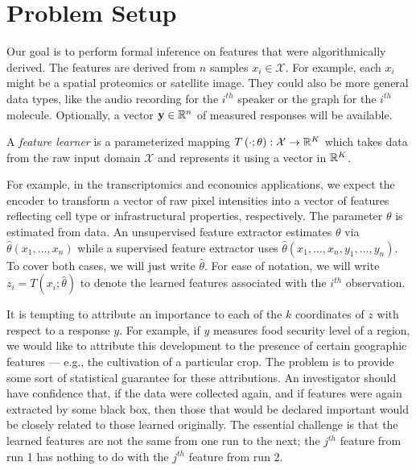 \section{Problem Setup}
\label{sec:psetup}

Our goal is to perform formal inference on features that were algorithmically
derived. The features are derived from $n$ samples $x_i \in \mathcal{X}$. For
example, each $x_{i}$ might be a spatial proteomics or satellite image. They
could also be more general data types, like the audio recording for the $i^{th}$
speaker or the graph for the $i^{th}$ molecule. Optionally, a vector
$\mathbf{y}\in \mathbb{R}^{n}$ of measured responses will be available.

\begin{definition}
A \textit{feature learner} is a parameterized mapping $T\left(\cdot;
\theta\right): \mathcal{X} \to \mathbb{R}^{K}$ which takes data from the raw input
domain $\mathcal{X}$ and represents it using a vector in $\mathbb{R}^{K}$.
\end{definition}

For example, in the transcriptomics and economics applications, we expect the
encoder to transform a vector of raw pixel intensities into a vector of features
reflecting cell type or infrastructural properties, respectively. The parameter
$\theta$ is estimated from data. An unsupervised feature extractor estimates
$\theta$ via $\hat{\theta}\left(x_{1}, \dots, x_{n}\right)$ while a supervised
feature extractor uses $\hat{\theta}\left(x_{1}, \dots, x_{n}, y_{1}, \dots,
y_{n}\right)$. To cover both cases, we will just write $\hat{\theta}$. For ease
of notation, we will write $z_{i} = T\left(x_{i}; \hat{\theta}\right)$ to denote
the learned features associated with the $i^{th}$ observation.

It is tempting to attribute an importance to each of the $k$ coordinates of $z$
with respect to a response $y$. For example, if $y$ measures food security level
of a region, we would like to attribute this development to the presence of
certain geographic features — e.g., the cultivation of a particular crop. The
problem is to provide some sort of statistical guarantee for these attributions.
An investigator should have confidence that, if the data were collected again,
and if features were again extracted by some black box, then those that would be
declared important would be closely related to those learned originally. The
essential challenge is that the learned features are not the same from one run
to the next; the $j^{th}$ feature from run 1 has nothing to do with the $j^{th}$
feature from run 2.

